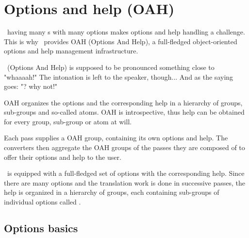 
\chapter{Options and help (OAH)}

\mf\ having many \service s with many options makes options and help handling a challenge.\\
This is why \mf\ provides OAH (Options And Help), a full-fledged object-oriented options and help management infrastructure.

\oahRepr\ (Options And Help) is supposed to be pronounced something close to "whaaaah!"
    The intonation is left to the speaker, though...
    And as the saying goes: "\oahRepr? why not!"

OAH organizes the options and the corresponding help in a hierarchy of groups, sub-groups and so-called atoms. OAH is introspective, thus help can be obtained for every group, sub-group or atom at will.

Each pass supplies a OAH group, containing its own options and help. The converters then aggregate the OAH groups of the passes they are composed of to offer their options and help to the user.

\mf\ is equipped with a full-fledged set of options with the corresponding help. Since there are many options and the translation work is done in successive passes, the help is organized in a hierarchy of groups, each containing sub-groups of individual options called .


\section{Options basics}

